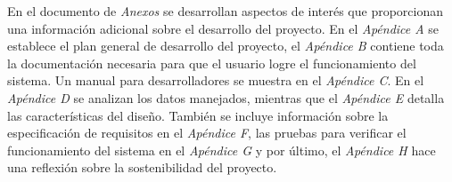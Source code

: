 En el documento de \textit{Anexos} se desarrollan aspectos de interés que proporcionan una información adicional sobre el desarrollo del proyecto. En el \textit{Apéndice A} se establece el plan general de desarrollo del proyecto, el \textit{Apéndice B} contiene toda la documentación necesaria para que el usuario logre el funcionamiento del sistema. Un manual para desarrolladores se muestra en el \textit{Apéndice C}. En el \textit{Apéndice D} se analizan los datos manejados, mientras que el \textit{Apéndice E} detalla las características del diseño. También se incluye información sobre la especificación de requisitos en el \textit{Apéndice F}, las pruebas para verificar el funcionamiento del sistema en el \textit{Apéndice G} y por último, el \textit{Apéndice H} hace una reflexión sobre la sostenibilidad del proyecto.
 
